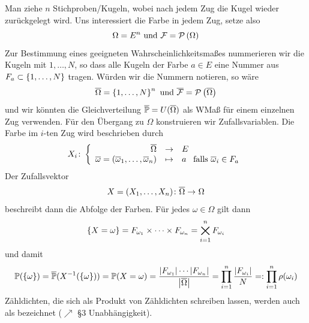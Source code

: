 Man ziehe $n$ Stichproben/Kugeln, wobei nach jedem Zug die Kugel wieder zurückgelegt wird. Uns interessiert die Farbe in jedem Zug, setze also
\begin{equation*}
	\Omega = E^n \text{ und } \mathcal{F} = \mathcal{P}\left( \Omega \right) 
\end{equation*}
Zur Bestimmung eines geeigneten Wahrscheinlichkeitsmaßes nummerieren wir die Kugeln mit $1,\dots, N$, so dass alle Kugeln der Farbe $a \in E$ eine Nummer aus $F_{a} \subset \left\{ 1,\dots, N \right\}$ tragen. Würden wir die Nummern notieren, so wäre
\begin{equation*}
	\overline{\Omega} = \left\{ 1,\dots, N \right\}^n \text{ und } \overline{\mathcal{F}} = \mathcal{P}\left( \overline{\Omega} \right)
\end{equation*}
und wir könnten die Gleichverteilung $\overline{\mathbb{P}} = U(\overline{\Omega})$ als WMaß für einem einzelnen Zug verwenden. Für den Übergang zu $\Omega$ konstruieren wir  Zufallsvariablen. Die Farbe im $i$-ten Zug wird beschrieben durch
\begin{equation*}
	X_i \colon \left\lbrace \begin{array}{rcl} \overline{\Omega} & \to & E \\\overline{\omega} = \left( \overline{\omega}_1, \dots, \overline{\omega}_n \right) & \mapsto & a \enskip \text{ falls } \overline{\omega}_i \in F_a \end{array} \right.
\end{equation*}
Der Zufallsvektor
\begin{equation*}
	\abb{X = (X_1, \dots, X_n)}{\quer{\Omega}}{\Omega}
\end{equation*}
beschreibt dann die Abfolge der Farben. Für jedes $\omega \in \Omega$ gilt dann
\begin{equation*}
	\left\{ X = \omega \right\} = F_{\omega_1} \times \cdots \times F_{\omega_n} = \bigtimes_{i=1}^{n} F_{\omega_i}
\end{equation*}
und damit
\begin{equation*}
    \mathbb{P}(\left\{ \omega \right\}) 
    = \overline{\mathbb{P}}(X^{-1}(\left\{ \omega \right\})) = \mathbb{P}(X=\omega)
    = \frac{\left| F_{\omega_1} \right| \cdots \left| F_{\omega_n} \right|}{\left| \overline{\Omega} \right|}
    = \prod_{i=1}^{n} \frac{\left| F_{\omega_i} \right|}{N} 
    \mathrel{=:} \prod_{i=1}^{n} \rho(\omega_i)
\end{equation*}
Zähldichten, die sich als Produkt von Zähldichten schreiben lassen, werden auch als  bezeichnet ($\nearrow$  \S 3 Unabhängigkeit).

